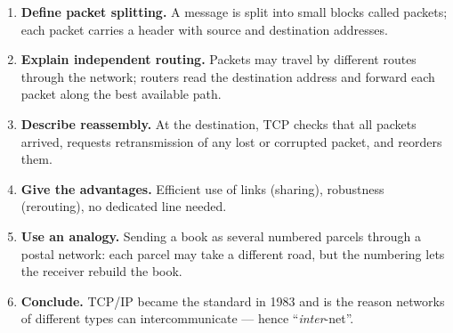\documentclass[11pt]{article}
\begin{document}
\begin{methode}
\begin{enumerate}
\item \textbf{Define packet splitting.} A message is split into small blocks called packets; each packet carries a header with source and destination addresses.
\item \textbf{Explain independent routing.} Packets may travel by different routes through the network; routers read the destination address and forward each packet along the best available path.
\item \textbf{Describe reassembly.} At the destination, TCP checks that all packets arrived, requests retransmission of any lost or corrupted packet, and reorders them.
\item \textbf{Give the advantages.} Efficient use of links (sharing), robustness (rerouting), no dedicated line needed.
\item \textbf{Use an analogy.} Sending a book as several numbered parcels through a postal network: each parcel may take a different road, but the numbering lets the receiver rebuild the book.
\item \textbf{Conclude.} TCP/IP became the standard in 1983 and is the reason networks of different types can intercommunicate — hence ``\emph{inter}-net''.
\end{enumerate}
\end{methode}
\end{document}
